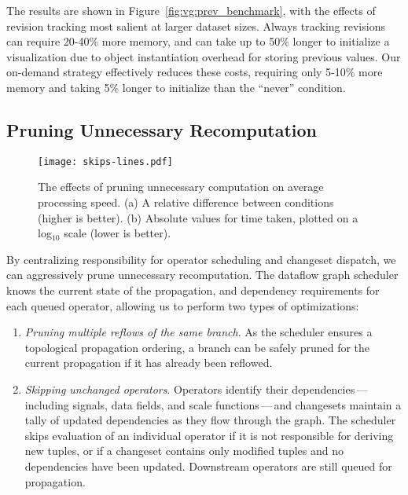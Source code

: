 The results are shown in Figure~\ref{fig:vg:prev_benchmark}, with the effects of
revision tracking most salient at larger dataset sizes. Always tracking
revisions can require 20-40\% more memory, and can take up to 50\% longer to
initialize a visualization due to object instantiation overhead for storing
previous values. Our on-demand strategy effectively reduces these costs,
requiring only 5-10\% more memory and taking 5\% longer to initialize than the
``never'' condition.

\subsection{Pruning Unnecessary Recomputation}
\label{sec:pruning}

\begin{figure}[h!]
  \centering
  \texttt{[image: skips-lines.pdf]}
  \caption{The effects of pruning unnecessary computation on average processing
speed. (a) A relative difference between conditions (higher is better). (b)
Absolute values for time taken, plotted on a log$_{10}$ scale (lower is better).}
  \label{fig:vg:skips_benchmark}
\end{figure}

By centralizing responsibility for operator scheduling and changeset dispatch,
we can aggressively prune unnecessary recomputation. The dataflow graph
scheduler knows the current state of the propagation, and dependency
requirements for each queued operator, allowing us to perform two types of
optimizations:

\begin{enumerate}
  \item \emph{Pruning multiple reflows of the same branch}. As the scheduler
  ensures a topological propagation ordering, a branch can be safely pruned for
  the current propagation if it has already been reflowed.

  \item \emph{Skipping unchanged operators}. Operators identify their
dependencies\,---\,including signals, data fields, and scale functions\,---\,and
changesets maintain a tally of updated dependencies as they flow through the
graph. The scheduler skips evaluation of an individual operator if it is not
responsible for deriving new tuples, or if a changeset contains only modified
tuples and no dependencies have been updated. Downstream operators are still
queued for propagation.
\end{enumerate}

